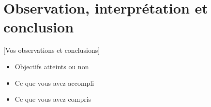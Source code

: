 \documentclass[12pt,a4paper]{article}
\begin{document}
\section{Observation, interprétation et conclusion}
 [Vos observations et conclusions]
\begin{itemize}
    \item Objectifs atteints ou non
    \item Ce que vous avez accompli
    \item Ce que vous avez compris
\end{itemize}
\end{document}
